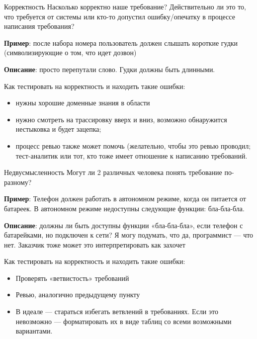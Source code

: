 \documentclass{beamer}
\begin{document}
\begin{frame}[t]{Корректность}
Насколько корректно наше требование? Действительно ли это то, что требуется от
системы или кто-то допустил ошибку/опечатку в процессе написания требования?

\textbf{Пример}: после набора номера пользователь должен слышать короткие гудки (символизирующие о том,
что идет дозвон)

\textbf{Описание}: просто перепутали слово. Гудки должны быть длинными.

Как тестировать на корректность и находить такие ошибки:
\begin{itemize}
\item нужны хорошие доменные знания в области 
\item нужно смотреть на трассировку вверх и вниз, возможно обнаружится нестыковка и будет зацепка;
\item процесс ревью также может помочь (желательно, чтобы это ревью проводил;
тест-аналитик или тот, кто тоже имеет отношение к написанию требований.
\end{itemize}
\end{frame}

\begin{frame}[t]{Недвусмысленность}
Могут ли 2 различных человека понять требование по-разному?

\textbf{Пример}: Телефон должен работать в автономном режиме, когда он питается от батареек. В
автономном режиме недоступны следующие функции: бла-бла-бла.

\textbf{Описание}: должны ли быть доступны функции «бла-бла-бла», если телефон с батарейками, но подключен к
сети? Я могу подумать, что да, программист — что нет. Заказчик тоже может это интерпретировать как захочет

Как тестировать на корректность и находить такие ошибки:
\begin{itemize}
\item Проверять «ветвистость» требований
\item Ревью, аналогично предыдущему пункту
\item В идеале — стараться избегать ветвлений в требованиях. Если это невозможно — форматировать их в виде
таблиц со всеми возможными вариантами.
\end{itemize}
\end{frame}
\end{document}
